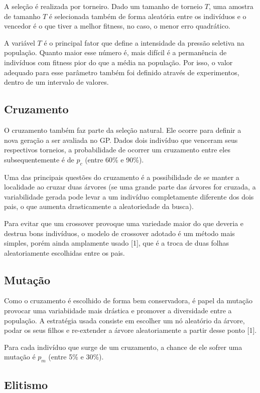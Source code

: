 \documentclass[11pt]{article}
\begin{document}
A seleção é realizada por torneiro. Dado um tamanho de torneio $T$, uma amostra de tamanho $T$ é selecionada também de forma aleatória entre os indivíduos e o vencedor é o que tiver a melhor fitness, no caso, o menor erro quadrático. 

A variável $T$ é o principal fator que define a intensidade da pressão seletiva na população. Quanto maior esse número é, mais difícil é a permanência de indivíduos com fitness pior do que a média na população. Por isso, o valor adequado para esse parâmetro também foi definido através de experimentos, dentro de um intervalo de valores.

\subsection*{Cruzamento}

O cruzamento também faz parte da seleção natural. Ele ocorre para definir a nova geração a ser avaliada no GP. Dados dois indivíduo que venceram seus respectivos torneios, a probabilidade de ocorrer um cruzamento entre eles subsequentemente é de $p_c$ (entre 60\% e 90\%).

Uma das principais questões do cruzamento é a possibilidade de se manter a localidade ao cruzar duas árvores (se 	uma grande parte das árvores for cruzada, a variabilidade gerada pode levar a um indivíduo completamente diferente dos dois pais, o que aumenta drasticamente a aleatoriedade da busca).

Para evitar que um crossover provoque uma variedade maior do que deveria e destrua bons indivíduos, o modelo de crossover adotado é um método mais simples, porém ainda amplamente usado [1], que é a troca de duas folhas aleatoriamente escolhidas entre os pais.

\subsection*{Mutação}

Como o cruzamento é escolhido de forma bem conservadora, é papel da mutação provocar uma variabiidade mais drástica e promover a diversidade entre a população. A estratégia usada consiste em escolher um nó aleatório da árvore, podar os seus filhos e re-extender a árvore aleatoriamente a partir desse ponto [1].

Para cada indivíduo que surge de um cruzamento, a chance de ele sofrer uma mutação é $p_m$ (entre 5\% e 30\%).

\subsection*{Elitismo}
\end{document}
